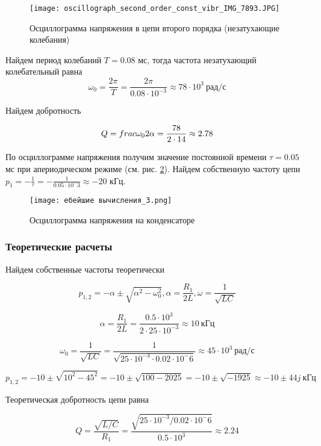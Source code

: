 \begin{figure}[!h]
    \centering
    \texttt{[image: oscillograph\_second\_order\_const\_vibr\_IMG\_7893.JPG]}
    \caption{Осциллограмма напряжения в цепи второго порядка (незатухающие колебания)}
    \label{fig:oscillograph_second_order_const}
\end{figure}

Найдем период
колебаний $T = 0.08$ мс, тогда частота незатухающий
колебательный равна
\[
    \omega_0 = \frac{2\pi}{T}
    = \frac{2\pi}{0.08 \cdot 10^{-3}} \approx 78 \cdot 10^3\ \text{рад/с}
\]

Найдем добротность

\[
    Q = \\frac{\omega_0}{2\alpha}
    = \frac{78}{2 \cdot 14} \approx 2.78
\]

По осциллограмме напряжения получим значение постоянной времени
$\tau = 0.05$ мс при апериодическом режиме
(см. рис. \ref*{fig:culculations_second_order_aperiodic}).
Найдем собственную частоту цепи $p_1 = -\frac{1}{\tau} = -\frac{1}{0.05 \cdot 10^-3} \approx - 20$ кГц.

\begin{figure}[!h]
    \centering
    \texttt{[image: ебейшие вычисления\_3.png]}
    \caption{Осциллограмма напряжения на конденсаторе}
    \label{fig:culculations_second_order_aperiodic}
\end{figure}

\subsubsection{Теоретические расчеты}

Найдем собственные частоты теоретически

\[
    p_{1,2} = -\alpha \pm \sqrt{\alpha^2 - \omega_0^2 },
    \alpha = \frac{R_1}{2L},
    \omega = \frac{1}{\sqrt{LC}}
\]

\[
    \alpha = \frac{R_1}{2L}
    = \frac{0.5 \cdot 10^3}{2 \cdot 25 \cdot 10^{-3}}
    \approx 10\ \text{кГц}
\]

\[
    \omega_0 = \frac{1}{\sqrt{LC}}
    = \frac{1}{\sqrt{25 \cdot 10^{-3} \cdot 0.02 \cdot 10^-6}}
    \approx 45 \cdot 10^3 \ \text{рад/с}
\]

\[
    p_{1,2} = -10 \pm \sqrt{10^2 - 45^2}
    = -10 \pm \sqrt{100 - 2025}
    = -10 \pm \sqrt{-1925}
    \approx -10 \pm 44j\ \text{кГц}
\]

Теоретическая добротность цепи равна

\[
    Q = \frac{\sqrt{L/C}}{R_1}
    = \frac{\sqrt{25 \cdot 10^{-3} / 0.02 \cdot 10^-6}}{0.5 \cdot 10^3}
    \approx 2.24
\]


